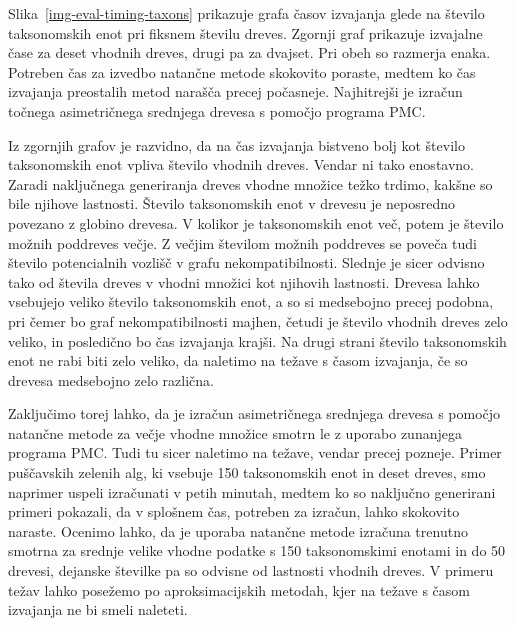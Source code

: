 \documentclass[a4paper, 12pt]{book}
\begin{document}

Slika~\ref{img-eval-timing-taxons} prikazuje grafa časov izvajanja glede na število 
taksonomskih enot pri fiksnem številu dreves. Zgornji graf  prikazuje izvajalne čase
za deset vhodnih dreves, drugi pa za dvajset. Pri obeh so razmerja enaka. Potreben čas
za izvedbo natančne metode skokovito poraste, medtem ko čas izvajanja preostalih 
metod narašča precej počasneje. Najhitrejši je izračun točnega asimetričnega srednjega 
drevesa s pomočjo programa PMC.

Iz zgornjih grafov je razvidno, da na čas izvajanja bistveno bolj kot število taksonomskih
enot vpliva število vhodnih dreves. Vendar ni tako enostavno. Zaradi naključnega generiranja 
dreves vhodne množice težko trdimo, kakšne so bile njihove lastnosti.  Število 
taksonomskih enot v drevesu je neposredno povezano z globino drevesa. V kolikor
je taksonomskih enot več, potem je število možnih poddreves večje. Z večjim številom
možnih poddreves se poveča tudi število potencialnih vozlišč v grafu nekompatibilnosti.
Slednje je sicer odvisno tako od števila dreves v vhodni množici kot njihovih lastnosti.
Drevesa lahko vsebujejo veliko število taksonomskih enot, a so si medsebojno precej
podobna, pri čemer bo graf nekompatibilnosti majhen, četudi je število vhodnih dreves 
zelo veliko, in posledično bo čas izvajanja krajši. Na drugi strani število taksonomskih 
enot ne rabi biti zelo veliko, da naletimo na težave s časom izvajanja, če so drevesa 
medsebojno zelo različna.

Zaključimo torej lahko, da je izračun asimetričnega srednjega drevesa s pomočjo natančne
metode za večje vhodne množice smotrn le z uporabo
zunanjega programa PMC. Tudi tu sicer naletimo na težave, vendar precej pozneje. Primer 
puščavskih zelenih alg, ki vsebuje 150 taksonomskih enot in deset dreves, smo naprimer 
uspeli izračunati v petih minutah, medtem ko so naključno generirani primeri 
pokazali, da v splošnem čas, potreben za izračun, lahko skokovito naraste. Ocenimo
lahko, da je uporaba natančne metode izračuna trenutno smotrna za srednje velike 
vhodne podatke s 150 taksonomskimi enotami in do 50 drevesi, dejanske številke pa so odvisne od
lastnosti vhodnih dreves. V primeru težav lahko posežemo po aproksimacijskih metodah, 
kjer na težave s časom izvajanja ne bi smeli naleteti.
\end{document}
